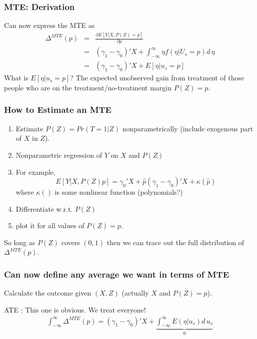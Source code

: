 \begin{frame}
  \frametitle{MTE: Derivation}
Can now express the MTE as   
\begin{eqnarray*}
\Delta^{MTE}(p) &=& \frac{\partial E[Y | X, P(Z)=p]}{\partial p} \\
  &=& (\gamma_1 - \gamma_0)'X + \int_{-\infty}^{\infty} \eta f(\eta | U_s =p) d\, \eta\\
&=& (\gamma_1 - \gamma_0)'X + E[\eta | u_s =p]
\end{eqnarray*}
What is $E[\eta | u_s =p]$? The expected unobserved gain from treatment of those people who are on the treatment/no-treatment margin $P(Z)=p$.
\end{frame}

\begin{frame}
\frametitle{How to Estimate an MTE}
\begin{enumerate}
\item Estimate $P(Z) = Pr(T=1 | Z)$ nonparametrically (include exogenous part of $X$ in $Z$).
\item Nonparametric regression of $Y$ on $X$ and $P(Z)$ 
\item For example, 
$$ E[Y|X, P(Z)p] = \gamma_0' X + \hat p (\gamma_1 - \gamma_0)'X + \kappa(\hat p) $$ 
where $\kappa()$ is some nonlinear function (polynomials?)
\item Differentiate w.r.t. $P(Z)$
\item plot it for all values of $P(Z)=p$.
\end{enumerate}
So long as $P(Z)$ covers $(0,1)$ then we can trace out the full distribution of $\Delta^{MTE}(p)$.
\end{frame}

\begin{frame}
  \footnotesize
  \frametitle{Can now define any average we want in terms of MTE}
  Calculate the outcome given $(X,Z)$ (actually $X$ and $P(Z)=p$).
  
  ATE : This one is obvious. We treat everyone!
  \begin{eqnarray*}
  \int_{-\infty}^{\infty} \Delta^{MTE}(p) = (\gamma_1 - \gamma_0)'X + \underbrace{\int_{-\infty}^{\infty} E(\eta | u_s) d\, u_s}_{0}
  \end{eqnarray*}
\end{frame}
    

